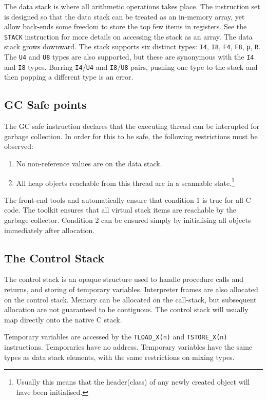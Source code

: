 The data stack is where all arithmetic operations takes place. The instruction set is designed so that the data stack can be treated as an in-memory array, yet allow back-ends some freedom to store the top few items in registers.  See the \verb|STACK| instruction for more details on accessing the stack as an array. The data stack grows downward. The stack supports six distinct types: \verb|I4|, \verb|I8|, \verb|F4|, \verb|F8|,  \verb|p|, \verb|R|. The \verb|U4| and \verb|U8| types are also supported, but these are synonymous with the \verb|I4| and \verb|I8| types. Barring \verb|I4|/\verb|U4| and \verb|I8|/\verb|U8| pairs, pushing one type to the stack and then popping a different type is an error.

\subsection{GC Safe points}
The GC safe instruction declares that the executing thread can be interupted for garbage collection. In order for this to be safe, the following restrictions must be observed:
\begin{enumerate}
\item No non-reference values are on the data stack.
\item All heap objects reachable from this thread are in a scannable state.\footnote{Usually this means that the header(class) of any newly created object will have been initialised.}
\end{enumerate}
The front-end tools \gvmtc{} and \gvmtic{} automatically ensure that condition 1 is true for all C code.
The toolkit ensures that all virtual stack items are reachable by the garbage-collector.
Condition 2 can be ensured simply by initialising all objects immediately after allocation.

\subsection{The Control Stack}

The control stack is an opaque structure used to handle procedure calls and returns, and storing of temporary variables. Interpreter frames are also allocated on the control stack. Memory can be allocated on the call-stack, but subsequent allocation are not guaranteed to be contiguous.
The control stack will usually map directly onto the native C stack.

Temporary variables are accessed by the \verb|TLOAD_X(n)| and \verb|TSTORE_X(n)| instructions. Temporaries have no address.
Temporary variables have the same types as data stack elements, with the same restrictions on mixing types.


